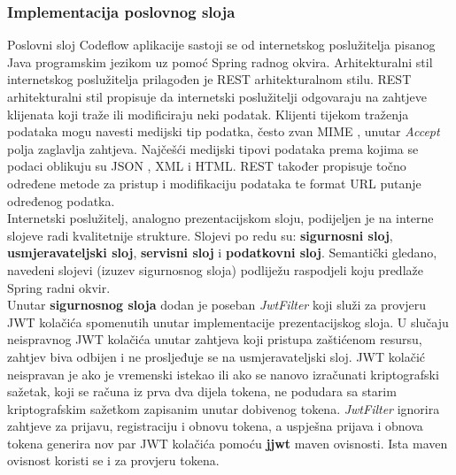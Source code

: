 \documentclass[times, utf8, zavrsni, numeric]{fer}
\begin{document}
	 		\subsubsection{Implementacija poslovnog sloja}
	 		Poslovni sloj Codeflow aplikacije sastoji se od internetskog poslužitelja pisanog Java programskim jezikom uz pomoć Spring radnog okvira. Arhitekturalni stil internetskog poslužitelja prilagođen je REST\cite{rest2021}  arhitekturalnom stilu. REST arhitekturalni stil propisuje da internetski poslužitelji odgovaraju na zahtjeve klijenata koji traže ili modificiraju neki podatak. Klijenti tijekom traženja podataka mogu navesti medijski tip podatka, često zvan MIME , unutar \textit{Accept} polja zaglavlja zahtjeva. Najčešći medijski tipovi podataka prema kojima se podaci oblikuju su JSON , XML  i HTML. REST također propisuje točno određene metode za pristup i modifikaciju podataka te format URL putanje određenog podatka.\\ Internetski poslužitelj, analogno prezentacijskom sloju, podijeljen je na interne slojeve radi kvalitetnije strukture. Slojevi po redu su: \textbf{sigurnosni sloj}, \textbf{usmjeravateljski sloj}, \textbf{servisni sloj} i \textbf{podatkovni sloj}. Semantički gledano, navedeni slojevi (izuzev sigurnosnog sloja) podliježu raspodjeli koju predlaže Spring radni okvir.\\
	 		Unutar \textbf{sigurnosnog sloja} dodan je poseban \textit{JwtFilter} koji služi za provjeru JWT kolačića spomenutih unutar implementacije prezentacijskog sloja. U slučaju neispravnog JWT kolačića unutar zahtjeva koji pristupa zaštićenom resursu, zahtjev biva odbijen i ne prosljeđuje se na usmjeravateljski sloj. JWT kolačić neispravan je ako je vremenski istekao ili ako se nanovo izračunati kriptografski sažetak, koji se računa  iz prva dva dijela tokena, ne podudara sa starim kriptografskim sažetkom zapisanim unutar dobivenog tokena. \textit{JwtFilter} ignorira zahtjeve za prijavu, registraciju i obnovu tokena, a uspješna prijava i obnova tokena generira nov par JWT kolačića pomoću \textbf{jjwt}\cite{jjwt2021} maven ovisnosti. Ista maven ovisnost koristi se i za provjeru tokena.
\end{document}
